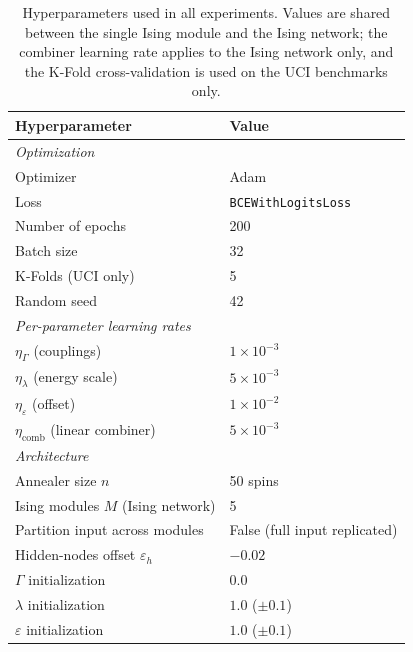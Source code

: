 \documentclass{ieeeaccess}
\begin{document}
\begin{table}[H]
\centering
\caption{Hyperparameters used in all experiments. Values are shared between
the single Ising module and the Ising network; the combiner learning rate
applies to the Ising network only, and the K-Fold cross-validation is used on
the UCI benchmarks only.}
\label{tab:hyperparameters}
\begin{tabular}{ll}
\hline
Hyperparameter                                  & Value \\
\hline
\multicolumn{2}{l}{\textit{Optimization}} \\
Optimizer                                       & Adam \\
Loss                                            & \texttt{BCEWithLogitsLoss} \\
Number of epochs                                & 200 \\
Batch size                                      & 32 \\
K-Folds (UCI only)                              & 5 \\
Random seed                                     & 42 \\
\hline
\multicolumn{2}{l}{\textit{Per-parameter learning rates}} \\
$\eta_{\Gamma}$ (couplings)                     & $1\!\times\!10^{-3}$ \\
$\eta_{\lambda}$ (energy scale)                 & $5\!\times\!10^{-3}$ \\
$\eta_{\varepsilon}$ (offset)                   & $1\!\times\!10^{-2}$ \\
$\eta_{\text{comb}}$ (linear combiner)          & $5\!\times\!10^{-3}$ \\
\hline
\multicolumn{2}{l}{\textit{Architecture}} \\
Annealer size $n$                               & 50 spins \\
Ising modules $M$ (Ising network)               & 5 \\
Partition input across modules                  & False (full input replicated) \\
Hidden-nodes offset $\varepsilon_h$             & $-0.02$ \\
$\Gamma$ initialization                         & $0.0$ \\
$\lambda$ initialization                        & $1.0$ ($\pm 0.1$) \\
$\varepsilon$ initialization                    & $1.0$ ($\pm 0.1$) \\

\end{tabular}
\end{table}
\end{document}
